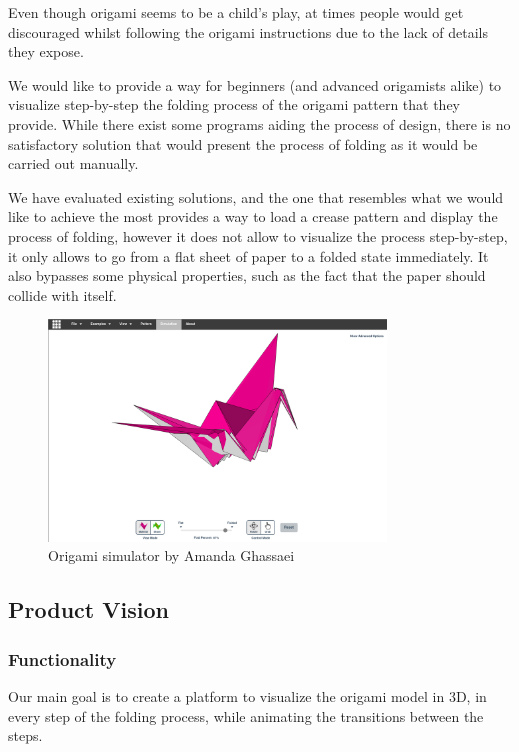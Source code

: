 Even though origami seems to be a child's play, at times
people would get discouraged whilst following the origami instructions due to
the lack of details they expose.

We would like to provide a way for beginners (and advanced origamists alike) to visualize step-by-step the folding process of the origami pattern that they provide.
While there exist some programs aiding the process of design, there is no satisfactory solution
that would present the process of folding as it would be carried out manually.

We have evaluated existing solutions, and the one that resembles 
what we would like to achieve the most \cite{origami-simulator} provides a way to load a crease pattern
and display the process of folding, however it does not allow to visualize the process step-by-step, it only allows 
to go from a flat sheet of paper to a folded state immediately. It also bypasses some physical properties, such as the fact that the
paper should collide with itself.


\begin{figure}[H]
\caption{Origami simulator by Amanda Ghassaei}
  \centering
    \includegraphics[width=0.8\textwidth]{assets/origami-simulator.png}
\end{figure}

\subsection{Product Vision}

\subsubsection{Functionality}

Our main goal is to create a platform to visualize the origami model in 3D,
in every step of the folding process, while animating the transitions between the steps.

